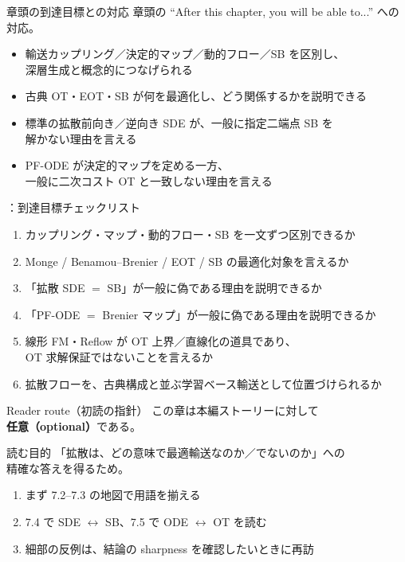 \asmain
\begin{frame}{章頭の到達目標との対応}
    章頭の ``After this chapter, you will be able to...'' への対応。
    \begin{itemize}
        \item 輸送カップリング／決定的マップ／動的フロー／SB を区別し、\\
        深層生成と概念的につなげられる
        \item 古典 OT・EOT・SB が何を最適化し、どう関係するかを説明できる
        \item 標準の拡散前向き／逆向き SDE が、一般に指定二端点 SB を\\
        解かない理由を言える
        \item PF-ODE が決定的マップを定める一方、\\
        一般に二次コスト OT と一致しない理由を言える
    \end{itemize}
\end{frame}
\assuppl
\begin{frame}{\supplmark：到達目標チェックリスト}
    \footnotesize
    \begin{enumerate}
        \item カップリング・マップ・動的フロー・SB を一文ずつ区別できるか
        \item Monge / Benamou--Brenier / EOT / SB の最適化対象を言えるか
        \item 「拡散 SDE $=$ SB」が一般に偽である理由を説明できるか
        \item 「PF-ODE $=$ Brenier マップ」が一般に偽である理由を説明できるか
        \item 線形 FM・Reflow が OT 上界／直線化の道具であり、\\
        OT 求解保証ではないことを言えるか
        \item 拡散フローを、古典構成と並ぶ学習ベース輸送として位置づけられるか
    \end{enumerate}
\end{frame}
\asmain
\begin{frame}{Reader route（初読の指針）}
    この章は本編ストーリーに対して\textbf{任意（optional）}である。
    \begin{block}{読む目的}
        「拡散は、どの意味で最適輸送なのか／でないのか」への\\
        精確な答えを得るため。
    \end{block}
    \begin{enumerate}
        \item まず 7.2--7.3 の地図で用語を揃える
        \item 7.4 で SDE $\leftrightarrow$ SB、7.5 で ODE $\leftrightarrow$ OT を読む
        \item 細部の反例は、結論の sharpness を確認したいときに再訪
    \end{enumerate}
\end{frame}
